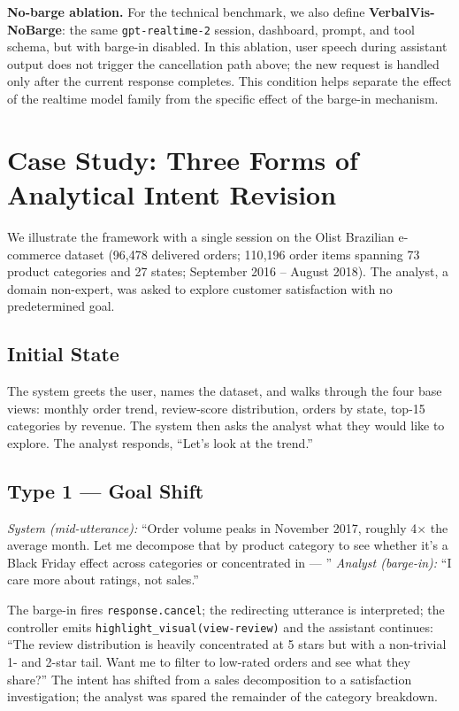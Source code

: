 \documentclass[journal]{IEEEtran}
\begin{document}
\noindent\textbf{No-barge ablation.}
For the technical benchmark, we also define \textbf{VerbalVis-NoBarge}: the same \texttt{gpt-realtime-2} session, dashboard, prompt, and tool schema, but with barge-in disabled. In this ablation, user speech during assistant output does not trigger the cancellation path above; the new request is handled only after the current response completes. This condition helps separate the effect of the realtime model family from the specific effect of the barge-in mechanism.

\section{Case Study: Three Forms of Analytical Intent Revision}
\label{sec:case}

We illustrate the framework with a single session on the Olist Brazilian e-commerce dataset (96{,}478 delivered orders; 110{,}196 order items spanning 73 product categories and 27 states; September 2016 -- August 2018). The analyst, a domain non-expert, was asked to explore customer satisfaction with no predetermined goal.

\subsection{Initial State} The system greets the user, names the dataset, and walks through the four base views: monthly order trend, review-score distribution, orders by state, top-15 categories by revenue. The system then asks the analyst what they would like to explore. The analyst responds, ``Let's look at the trend.''

\subsection{Type 1 --- Goal Shift}
\emph{System (mid-utterance):} ``Order volume peaks in November 2017, roughly 4$\times$ the average month. Let me decompose that by product category to see whether it's a Black Friday effect across categories or concentrated in --- ''
\emph{Analyst (barge-in):} ``I care more about ratings, not sales.''

The barge-in fires \texttt{response.cancel}; the redirecting utterance is interpreted; the controller emits \texttt{highlight\_visual(view-review)} and the assistant continues: ``The review distribution is heavily concentrated at 5 stars but with a non-trivial 1- and 2-star tail. Want me to filter to low-rated orders and see what they share?'' The intent has shifted from a sales decomposition to a satisfaction investigation; the analyst was spared the remainder of the category breakdown.
\end{document}
